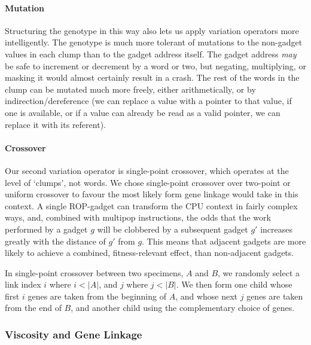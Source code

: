 \paragraph{Mutation}
Structuring the genotype in this way also
lets us apply variation operators more intelligently. The
genotype is much more tolerant of mutations to the non-gadget
values in each clump than to the gadget address itself. The
gadget address \emph{may} be safe to increment or decrement by a
word or two, but negating, multiplying, or masking it would
almost certainly result in a crash. The rest of the words in the
clump can be mutated much more freely, either arithmetically, or
by indirection/dereference (we can replace a value with a pointer
to that value, if one is available, or if a value can already be
read as a valid pointer, we can replace it with its referent).

\paragraph{Crossover}
Our second variation operator is single-point crossover, which
operates at the level of `clumps', not words. We chose
single-point crossover over two-point or uniform crossover
to favour the most likely form gene linkage would take in this
context. A single ROP-gadget can transform the CPU context in
fairly complex ways, and, combined with multipop instructions,
the odds that the work performed by a gadget $g$ will be
clobbered by a subsequent gadget $g'$ increases greatly with the
distance of $g'$ from $g$. This means that adjacent gadgets are
more likely to achieve a combined, fitness-relevant effect, than
non-adjacent gadgets. 

In single-point crossover between two specimens, $A$ and $B$, we
randomly select a link index $i$ where $i < |A|$, and $j$ where $j
< |B|$. We then form one child whose first $i$ genes are taken
from the beginning of $A$, and whose next $j$ genes are taken
from the end of $B$, and another child using the complementary
choice of genes. 

\subsubsection{Viscosity and Gene Linkage}

